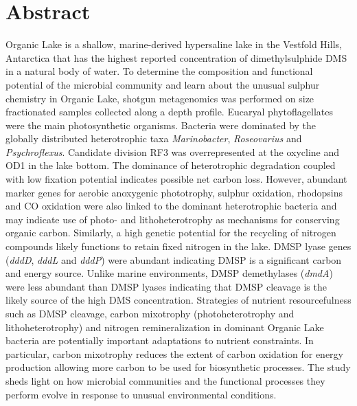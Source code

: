 \section{Abstract}
Organic Lake is a shallow, marine-derived hypersaline lake in the Vestfold Hills, Antarctica that has the highest reported concentration of dimethylsulphide \ac{DMS} in a natural body of water.
To determine the composition and functional potential of the microbial community and learn about the unusual sulphur chemistry in Organic Lake, shotgun metagenomics was performed on size fractionated samples collected along a depth profile.
Eucaryal phytoflagellates were the main photosynthetic organisms.
Bacteria were dominated by the globally distributed heterotrophic taxa \emph{Marinobacter}, \emph{Roseovarius} and \emph{Psychroflexus}.
Candidate division RF3 was overrepresented at the oxycline and OD1 in the lake bottom.
The dominance of heterotrophic degradation coupled with low fixation potential indicates possible net carbon loss.
However, abundant marker genes for aerobic anoxygenic phototrophy, sulphur oxidation, rhodopsins and CO oxidation were also linked to the dominant heterotrophic bacteria and may indicate use of photo- and lithoheterotrophy as mechanisms for conserving organic carbon.
Similarly, a high genetic potential for the recycling of nitrogen compounds likely functions to retain fixed nitrogen in the lake.
\ac{DMSP} lyase genes (\emph{dddD}, \emph{dddL} and \emph{dddP}) were abundant indicating \ac{DMSP} is a significant carbon and energy source.
Unlike marine environments, \ac{DMSP} demethylases (\emph{dmdA}) were less abundant than \ac{DMSP} lyases indicating that \ac{DMSP} cleavage is the likely source of the high \ac{DMS} concentration.
Strategies of nutrient resourcefulness such as \ac{DMSP} cleavage, carbon mixotrophy (photoheterotrophy and lithoheterotrophy) and nitrogen remineralization in dominant Organic Lake bacteria are potentially important adaptations to nutrient constraints.
In particular, carbon mixotrophy reduces the extent of carbon oxidation for energy production allowing more carbon to be used for biosynthetic processes.
The study sheds light on how microbial communities and the functional processes they perform evolve in response to unusual environmental conditions.

\newpage

\acresetall

